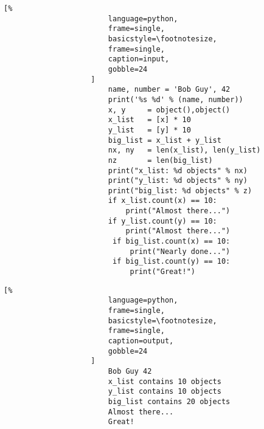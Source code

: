 \documentclass[crop=false,class=book]{standalone}
\begin{document}
                \begin{minipage}[t]{.48\textwidth}
                    \centering
                    \begin{lstlisting}[%
                        language=python,
                        frame=single,
                        basicstyle=\footnotesize,
                        frame=single,
                        caption=input,
                        gobble=24
                    ]
                        name, number = 'Bob Guy', 42
                        print('%s %d' % (name, number))
                        x, y     = object(),object()
                        x_list   = [x] * 10
                        y_list   = [y] * 10
                        big_list = x_list + y_list
                        nx, ny   = len(x_list), len(y_list)
                        nz       = len(big_list)
                        print("x_list: %d objects" % nx)
                        print("y_list: %d objects" % ny)
                        print("big_list: %d objects" % z)
                        if x_list.count(x) == 10:
                            print("Almost there...")
                        if y_list.count(y) == 10:
                            print("Almost there...")
                         if big_list.count(x) == 10:
                             print("Nearly done...")
                         if big_list.count(y) == 10:
                             print("Great!")
                    \end{lstlisting}
                \end{minipage}\hfill
                \begin{minipage}[t]{0.48\textwidth}
                    \centering
                    \begin{lstlisting}[%
                        language=python,
                        frame=single,
                        basicstyle=\footnotesize,
                        frame=single,
                        caption=output,
                        gobble=24
                    ]
                        Bob Guy 42
                        x_list contains 10 objects
                        y_list contains 10 objects
                        big_list contains 20 objects
                        Almost there...
                        Great!
                    \end{lstlisting}
                \end{minipage}
                \newpage
\end{document}
